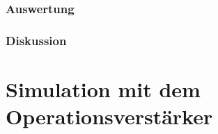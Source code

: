 \documentclass[12pt,a4paper]{article}
\begin{document}
\subsubsection{Auswertung}
\subsubsection{Diskussion}


\section{Simulation mit dem Operationsverstärker}
\end{document}
